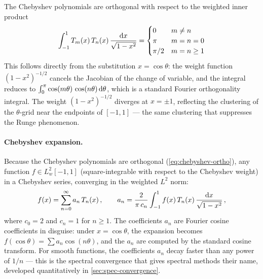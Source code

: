 The Chebyshev polynomials are orthogonal with respect to the
weighted inner product
%
\begin{equation}
  \int_{-1}^{1} T_m(x)\,T_n(x)\,
    \frac{\mathrm{d} x}{\sqrt{1 - x^2}}
  = \begin{cases}
      0 & m \neq n \\
      \pi & m = n = 0 \\
      \pi/2 & m = n \geq 1
    \end{cases}
  \label{eq:chebyshev-ortho}
\end{equation}
%
This follows directly from the substitution $x = \cos\theta$: the
weight function $(1 - x^2)^{-1/2}$ cancels the Jacobian of the
change of variable, and the integral reduces to
$\int_0^\pi \cos(m\theta)\,\cos(n\theta)\,\mathrm{d}\theta$, which is a
standard Fourier orthogonality integral.  The weight
$(1 - x^2)^{-1/2}$ diverges at $x = \pm 1$, reflecting the
clustering of the $\theta$-grid near the endpoints of $[-1,1]$
--- the same clustering that suppresses the Runge phenomenon.

\paragraph{Chebyshev expansion.}

Because the Chebyshev polynomials are orthogonal
(\cref{eq:chebyshev-ortho}), any function
$f \in L^2_w[-1,1]$ (square-integrable with respect to
the Chebyshev weight) in a Chebyshev series, converging in the
weighted $L^2$ norm:
%
\begin{equation}
  f(x) = \sum_{n=0}^{\infty} a_n\,T_n(x) \,,
  \qquad
  a_n = \frac{2}{\pi\,c_n}
    \int_{-1}^{1} f(x)\,T_n(x)\,
    \frac{\mathrm{d} x}{\sqrt{1 - x^2}} \,,
  \label{eq:chebyshev-expansion}
\end{equation}
%
where $c_0 = 2$ and $c_n = 1$ for $n \geq 1$.  The coefficients
$a_n$ are Fourier cosine coefficients in disguise: under
$x = \cos\theta$, the expansion becomes
$f(\cos\theta) = \sum a_n \cos(n\theta)$, and the $a_n$ are
computed by the standard cosine transform.  For smooth functions,
the coefficients $a_n$ decay faster than any power of $1/n$ ---
this is the spectral convergence that gives spectral methods their
name, developed quantitatively in \cref{sec:spec-convergence}.

